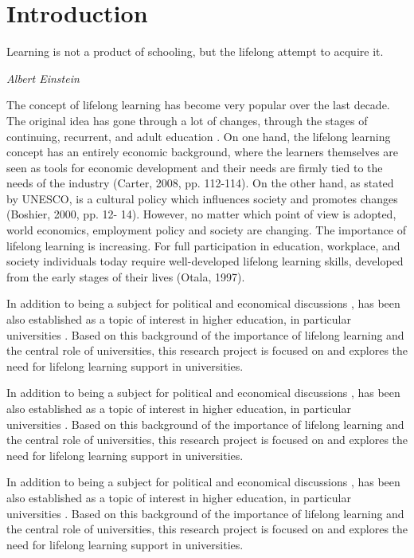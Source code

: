 \chapter{Introduction\label{cha:intro}}
\epigraph{Learning is not a product of schooling, but the lifelong attempt to
acquire it.}{\textit{Albert Einstein}}
\noindent
The concept of lifelong learning has become very popular over the last decade.
The original idea has gone through a lot of changes, through the stages of
continuing, recurrent, and adult education \citep{Jarvis2004}. On one hand, the
lifelong learning concept has an entirely economic background, where the
learners themselves are seen as tools for economic development and their needs
are firmly tied to the needs of the industry (Carter, 2008, pp. 112-114). On the
other hand, as stated by UNESCO, \LLLs is a cultural policy which influences
society and promotes changes (Boshier, 2000, pp. 12- 14). However, no matter
which point of view is adopted, world economics, employment policy and society
are changing. The importance of lifelong learning is increasing. For full
participation in education, workplace, and society individuals today require
well-developed lifelong learning skills, developed from the early stages of
their lives (Otala, 1997).

In addition to being a subject for political and economical discussions
\citep{Bagnall2009}, \LLLs has been also established as a topic of interest in
higher education, in particular universities \citep{Knapper2000}. Based on this
background of the importance of lifelong learning and the central role of
universities, this research project is focused on and explores the need for
lifelong learning support in universities.

In addition to being a subject for political and economical discussions
\citep{Bagnall2009}, \LLLs has been also established as a topic of interest in
higher education, in particular universities \citep{Knapper2000}. Based on this
background of the importance of lifelong learning and the central role of
universities, this research project is focused on and explores the need for
lifelong learning support in universities.

In addition to being a subject for political and economical discussions
\citep{Bagnall2009}, \LLLs has been also established as a topic of interest in
higher education, in particular universities \citep{Knapper2000}. Based on this
background of the importance of lifelong learning and the central role of
universities, this research project is focused on and explores the need for
lifelong learning support in universities.

